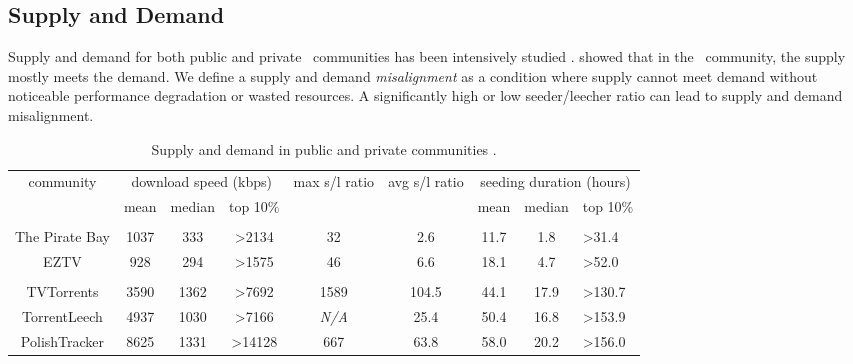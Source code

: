 \subsection{Supply and Demand}
\label{section:suppdemand}
Supply and demand for both public and private \bt~communities has been intensively studied \cite{2010:pubpriv:meulpolder, 2009:demandsupplyres:andrade}. \citeauthor{2009:demandsupplyres:andrade} showed that in the \bt~community, the supply mostly meets the demand. We define a supply and demand \textit{misalignment} as a condition where supply cannot meet demand without noticeable performance degradation or wasted resources. A significantly high or low seeder/leecher ratio can lead to supply and demand misalignment.

\begin{table}[]
	\centering
	\caption{Supply and demand in public and private communities \cite{2010:pubpriv:meulpolder}.}
	\label{tbl:supdemand}
	\begin{adjustwidth}{-1.5cm}{}
		\begin{tabular}{|c|c|c|c|c|c|c|c|l|}
			\hline
			\multicolumn{1}{|c|}{\multirow{2}{0.1\linewidth}{community}} &  \multicolumn{3}{c|}{download speed (kbps)} & \multicolumn{1}{c|}{\multirow{2}{0.1\linewidth}{max s/l ratio}} & \multicolumn{1}{c|}{\multirow{2}{0.1\linewidth}{avg s/l ratio}} & \multicolumn{3}{c|}{seeding duration (hours)} \\ \cline{2-4} \cline{7-9} 
			\multicolumn{1}{|c|}{} & {mean} & {median} & {top 10\%} & {} & {} & {mean} & {median} & {top 10\%} \\ \hline
			\multicolumn{8}{l}{} \\ \hline
			The Pirate Bay & {1037} & {333} & {\textgreater2134} & 32 & {2.6} & {11.7} & {1.8} & {\textgreater31.4} \\ \hline
			EZTV  & {928} & {294} & {\textgreater1575} & 46 & {6.6} & {18.1} & {4.7} & {\textgreater52.0} \\ \hline
			\multicolumn{8}{l}{} \\ \hline
			TVTorrents & 3590 & 1362 & \textgreater7692 & 1589 & 104.5 & 44.1 & 17.9 & \textgreater130.7 \\ \hline
			TorrentLeech  & {4937} & {1030} & {\textgreater7166} & \textit{N/A} & {25.4} & {50.4} & {16.8} & {\textgreater153.9} \\ \hline
			PolishTracker  & {8625} & {1331} & {\textgreater14128} & 667 & {63.8} & {58.0} & {20.2} & {\textgreater156.0} \\ \hline
		\end{tabular}
	\end{adjustwidth}
\end{table}

